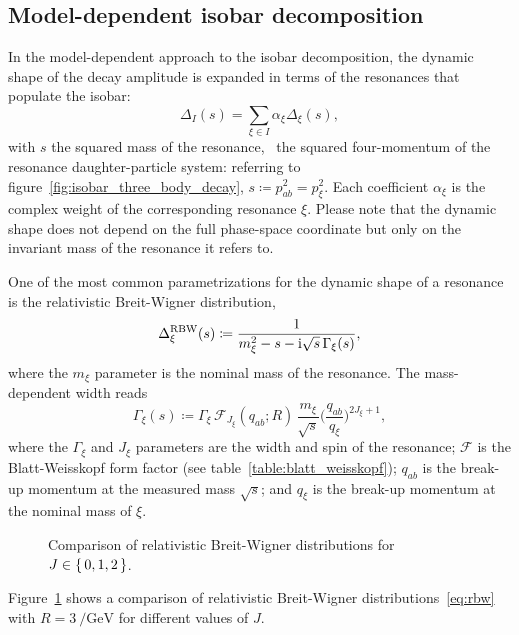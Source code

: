 \subsection{Model-dependent isobar decomposition}


    In the model-dependent approach to the isobar decomposition, the dynamic shape of the decay amplitude is expanded in terms of the resonances that populate the isobar:
    \begin{equation}\label{eq:isobar_mass_shape_expansion}
        \Delta_I(s) = \sum_{\xi\in I} \alpha_{\xi}\Delta_{\xi}(s),
    \end{equation}
    with $s$ the squared mass of the resonance, \ie~the squared four-momentum of the resonance daughter-particle system: referring to figure~\ref{fig:isobar_three_body_decay}, $s\coloneqq p_{ab}^2 = p_{\xi}^2$.
    Each coefficient $\alpha_{\xi}$ is the complex weight of the corresponding resonance $\xi$.
    Please note that the dynamic shape does not depend on the full phase-space coordinate but only on the invariant mass of the resonance it refers to.


    One of the most common parametrizations for the dynamic shape of a resonance is the relativistic Breit-Wigner distribution,
    \begin{equation}\label{eq:rbw}
        \Delta_{\xi}^{\text{RBW}}(s) \coloneqq \frac{1}{m_{\xi}^2 - s - \mathrm{i} \sqrt{s}\, \Gamma_\xi(s)},
    \end{equation}
    where the $m_{\xi}$ parameter is the nominal mass of the resonance.
    The mass-dependent width reads
    \begin{equation}
        \Gamma_\xi(s) \coloneqq \Gamma_{\xi} \, \mathcal{F}_{\!J_\xi}\!(q_{ab};R)\, \frac{m_{\xi}}{\sqrt{s}} \bigg(\frac{q_{ab}}{q_{\xi}}\bigg)^{2J_{\xi}+1},
    \end{equation}
    where the $\Gamma_{\xi}$ and $J_{\xi}$ parameters are the width and spin of the resonance;
    $\mathcal{F}$ is the Blatt-Weisskopf form factor (see table~\ref{table:blatt_weisskopf});
    $q_{ab}$ is the break-up momentum at the measured mass $\sqrt{s}$;
    and $q_\xi$ is the break-up momentum at the nominal mass of $\xi$.
    \begin{figure}
        \centering
        
        \caption{Comparison of relativistic Breit-Wigner distributions for $J\in\set{0,1,2}$.}
        \label{fig:comparison_rbws}
    \end{figure}
    Figure~\ref{fig:comparison_rbws} shows a comparison of relativistic Breit-Wigner distributions~\eqref{eq:rbw} with $R = \SI{3}{\per\giga\electronvolt}$ for different values of $J$.


